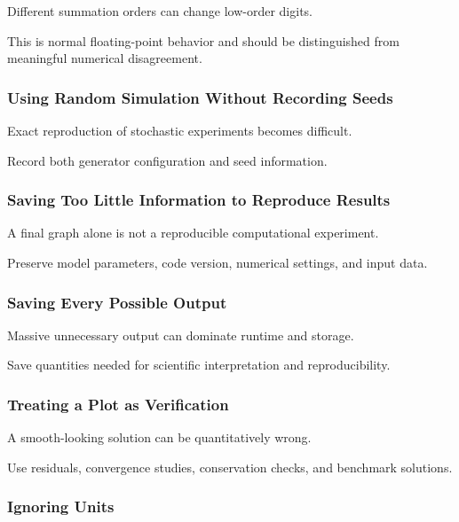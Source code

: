 Different summation orders can change low-order digits.

This is normal floating-point behavior and should be distinguished from
meaningful numerical disagreement.

\subsubsection{Using Random Simulation Without Recording Seeds}

Exact reproduction of stochastic experiments becomes difficult.

Record both generator configuration and seed information.

\subsubsection{Saving Too Little Information to Reproduce Results}

A final graph alone is not a reproducible computational experiment.

Preserve model parameters, code version, numerical settings, and input
data.

\subsubsection{Saving Every Possible Output}

Massive unnecessary output can dominate runtime and storage.

Save quantities needed for scientific interpretation and reproducibility.

\subsubsection{Treating a Plot as Verification}

A smooth-looking solution can be quantitatively wrong.

Use residuals, convergence studies, conservation checks, and benchmark
solutions.

\subsubsection{Ignoring Units}

